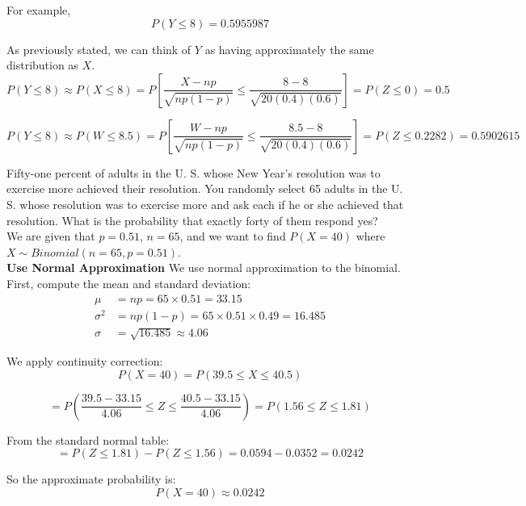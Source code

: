 \vspace{1em}

For example,
\[
P(Y \leq 8) = 0.5955987
\]

As previously stated, we can think of $Y$ as having approximately the same distribution as $X$.
\[
P(Y \leq 8) \approx P(X \leq 8)
= P\left[ \frac{X - np}{\sqrt{np(1 - p)}} \leq \frac{8 - 8}{\sqrt{20(0.4)(0.6)}} \right]
= P(Z \leq 0) = 0.5
\]

\vspace{1em}

\[
P(Y \leq 8) \approx P(W \leq 8.5)
= P\left[ \frac{W - np}{\sqrt{np(1 - p)}} \leq \frac{8.5 - 8}{\sqrt{20(0.4)(0.6)}} \right]
= P(Z \leq 0.2282) = 0.5902615
\]

\vspace{1em}

\begin{example}

Fifty-one percent of adults in the U. S. whose New Year’s resolution was to exercise more achieved their resolution. You randomly select 65 adults in the U. S. whose resolution was to exercise more and ask each if he or she achieved that resolution. What is the probability that exactly forty of them respond yes?\\

We are given that $p = 0.51$, $n = 65$, and we want to find $P(X = 40)$ where $X \sim Binomial(n = 65, p = 0.51)$.\\

\textbf{Use Normal Approximation}
\vspace{0.5 em}
We use normal approximation to the binomial. First, compute the mean and standard deviation:
\begin{align*}
\mu &= np = 65 \times 0.51 = 33.15 \\
\sigma^2 &= np(1-p) = 65 \times 0.51 \times 0.49 = 16.485 \\
\sigma &= \sqrt{16.485} \approx 4.06
\end{align*}


We apply continuity correction:
\[
P(X = 40) = P(39.5 \leq X \leq 40.5)
\]

\[
= P\left(\frac{39.5 - 33.15}{4.06} \leq Z \leq \frac{40.5 - 33.15}{4.06}\right) = P(1.56 \leq Z \leq 1.81)
\]

From the standard normal table:
\[
= P(Z \leq 1.81) - P(Z \leq 1.56) = 0.0594 - 0.0352 = 0.0242
\]

So the approximate probability is:
\[
P(X = 40) \approx 0.0242
\]
\end{example}






